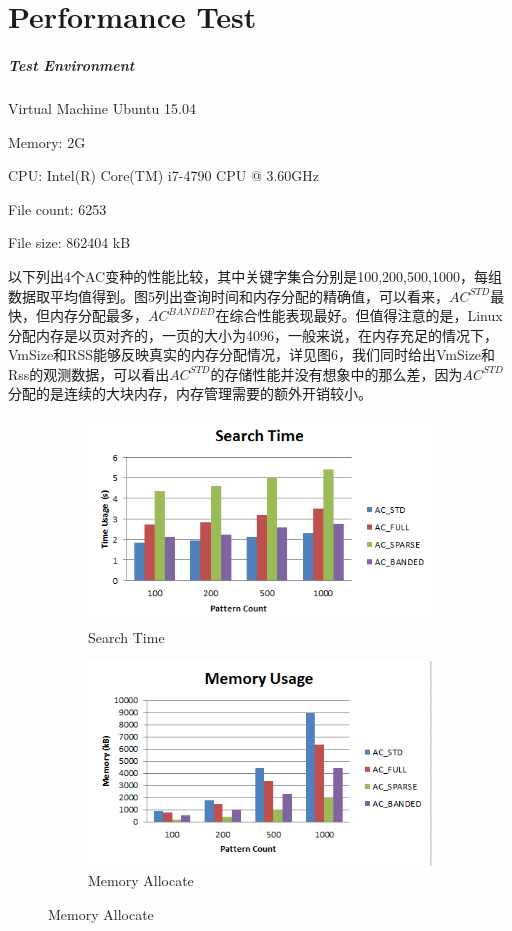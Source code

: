\documentclass{article}
\begin{document}
\section{Performance Test}
\subparagraph{Test Environment}
 \begin{list}{}{}
 \item  Virtual Machine Ubuntu 15.04
 \item  Memory: 2G
 \item  CPU: Intel(R) Core(TM) i7-4790 CPU @ 3.60GHz
 \item  File count: 6253
 \item  File size: 862404 kB
 \end{list}

以下列出4个AC变种的性能比较，其中关键字集合分别是100,200,500,1000，每组数据取平均值得到。图5列出查询时间和内存分配的精确值，可以看来，$AC^{STD}$最快，但内存分配最多，$AC^{BANDED}$在综合性能表现最好。但值得注意的是，Linux分配内存是以页对齐的，一页的大小为4096，一般来说，在内存充足的情况下，VmSize和RSS能够反映真实的内存分配情况，详见图6，我们同时给出VmSize和Rss的观测数据，可以看出$AC^{STD}$的存储性能并没有想象中的那么差，因为$AC^{STD}$分配的是连续的大块内存，内存管理需要的额外开销较小。
\begin{figure}[h]
  \centering
  \caption{\textsc{Performance Comparison}}
\begin{subfigure}[b]{0.3\textwidth}
  \includegraphics[scale=0.6]{res/1.png}
  \caption{Search Time}
  \label{fig:search}
\end{subfigure}

\begin{subfigure}[b]{0.3\textwidth}
  \includegraphics[scale=0.6]{res/2.png}
  \caption{Memory Allocate}
  \label{fig:mem}
\end{subfigure}
\end{figure}
\end{document}
